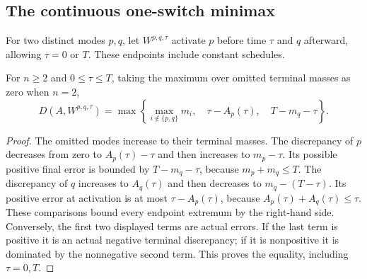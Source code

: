 \subsection{The continuous one-switch minimax}

For two distinct modes $p,q$, let $W^{p,q,\tau}$ activate $p$ before time
$\tau$ and $q$ afterward, allowing $\tau=0$ or $T$. These endpoints include
constant schedules.

\begin{lemma}\label{lem:one-switch-error}
For $n\ge2$ and $0\le\tau\le T$, taking the maximum over omitted
terminal masses as zero when $n=2$,
\begin{equation}\label{eq:one-switch-error}
 D(A,W^{p,q,\tau})=
 \max\left\{\max_{i\notin\{p,q\}}m_i,\quad
 \tau-A_p(\tau),\quad T-m_q-\tau\right\}.
\end{equation}
\end{lemma}
\begin{proof}
The omitted modes increase to their terminal masses. The discrepancy of $p$
decreases from zero to $A_p(\tau)-\tau$ and then increases to $m_p-\tau$.
Its possible positive final error is bounded by $T-m_q-\tau$, because
$m_p+m_q\le T$. The discrepancy of $q$ increases to $A_q(\tau)$ and then
decreases to $m_q-(T-\tau)$. Its positive error at activation is at most
$\tau-A_p(\tau)$, because $A_p(\tau)+A_q(\tau)\le\tau$.
These comparisons bound every endpoint extremum by the right-hand side.
Conversely, the first two displayed terms are actual errors. If the last
term is positive it is an actual negative terminal discrepancy; if it is
nonpositive it is dominated by the nonnegative second term. This proves the
equality, including $\tau=0,T$.
\end{proof}


